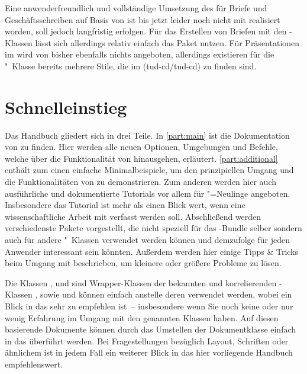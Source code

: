 Eine anwenderfreundlich und vollständige Umsetzung des \CDs für Briefe und 
Geschäftsschreiben auf Basis von \KOMAScript ist bis jetzt leider noch nicht 
mit \TUDScript realisiert worden, soll jedoch langfristig erfolgen. Für das 
Erstellen von Briefen mit den \TUDScript-Klassen lässt sich allerdings relativ 
einfach das Paket  nutzen. Für Präsentationen im \TUDCD wird 
von \TUDScript bisher ebenfalls nichts angeboten, allerdings existieren für die 
"~Klasse bereits mehrere Stile, die im \GitHubRepo(tud-cd/tud-cd) 
zu finden sind. 



\section{Schnelleinstieg}
%
Das Handbuch gliedert sich in drei Teile. In \autoref{part:main} ist die 
Dokumentation von \TUDScript zu finden. Hier werden alle neuen Optionen, 
Umgebungen und Befehle, welche über die Funktionalität von \KOMAScript 
hinausgehen, erläutert. \autoref{part:additional} enthält zum einen einfache 
Minimalbeispiele, um den prinzipiellen Umgang und die Funktionalitäten von 
\TUDScript zu demonstrieren. Zum anderen werden hier auch ausführliche und 
dokumentierte Tutorials vor allem für "=Neulinge angeboten. 
Insbesondere das Tutorial  ist mehr als einen Blick wert, 
wenn eine wissenschaftliche Arbeit mit  verfasst werden soll.
Abschließend werden verschiedenste Pakete vorgestellt, die nicht speziell für 
das \TUDScript-Bundle selber sondern auch für andere "~Klassen
verwendet werden können und demzufolge für jeden Anwender interessant sein 
könnten. Außerdem werden hier einige Tipps \& Tricks beim Umgang mit 
 beschrieben, um kleinere oder größere Probleme zu lösen.

Die Klassen ,  und  
sind Wrapper-Klassen der bekannten und korrelierenden \KOMAScript-Klassen 
,  sowie  und können einfach 
anstelle deren verwendet werden, wobei ein Blick in das \scrguide sehr zu 
empfehlen ist~-- insbesondere wenn Sie noch keine oder nur wenig Erfahrung im 
Umgang mit den genannten Klassen haben. Auf diesen basierende Dokumente können 
durch das Umstellen der Dokumentklasse einfach in das \TUDCD überführt werden. 
Bei Fragestellungen bezüglich Layout, Schriften oder ähnlichem ist in jedem 
Fall ein weiterer Blick in das hier vorliegende Handbuch empfehlenswert.
